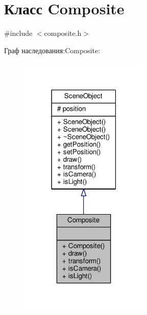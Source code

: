 \hypertarget{class_composite}{}\section{Класс Composite}
\label{class_composite}


{\ttfamily \#include $<$composite.\+h$>$}



Граф наследования\+:Composite\+:
\nopagebreak
\begin{figure}[H]
\begin{center}
\leavevmode
\includegraphics[width=174pt]{d5/d8c/class_composite__inherit__graph}
\end{center}
\end{figure}


